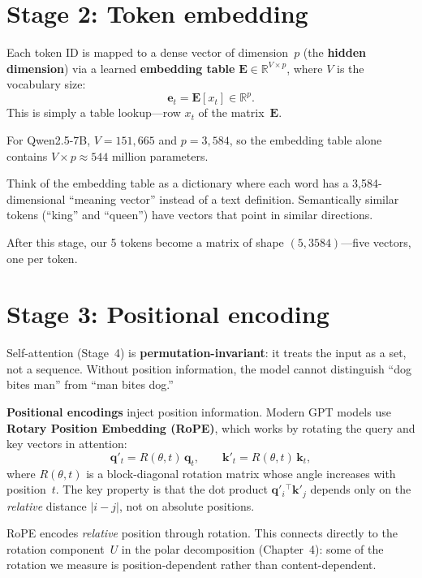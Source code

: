 \documentclass[11pt, twoside, openright]{memoir}
\begin{document}
\section{Stage 2: Token embedding}

Each token ID is mapped to a dense vector of dimension~$p$ (the
\textbf{hidden dimension}) via a learned \textbf{embedding table}
$\mathbf{E} \in \mathbb{R}^{V \times p}$, where $V$ is the vocabulary size:
\[
  \mathbf{e}_t = \mathbf{E}[x_t] \in \mathbb{R}^p.
\]
This is simply a table lookup---row $x_t$ of the matrix~$\mathbf{E}$.

For Qwen2.5-7B, $V = 151{,}665$ and $p = 3{,}584$, so the embedding table
alone contains $V \times p \approx 544$ million parameters.

\begin{analogy}
Think of the embedding table as a dictionary where each word has a
3{,}584-dimensional ``meaning vector'' instead of a text definition.
Semantically similar tokens (``king'' and ``queen'') have vectors that
point in similar directions.
\end{analogy}

After this stage, our 5 tokens become a matrix of shape $(5, 3584)$---five
vectors, one per token.

\section{Stage 3: Positional encoding}

Self-attention (Stage~4) is \textbf{permutation-invariant}: it treats the
input as a set, not a sequence.  Without position information, the model
cannot distinguish ``dog bites man'' from ``man bites dog.''

\textbf{Positional encodings} inject position information.  Modern GPT
models use \textbf{Rotary Position Embedding (RoPE)}, which works by
rotating the query and key vectors in attention:
\[
  \mathbf{q}'_t = R(\theta, t) \, \mathbf{q}_t,
  \qquad
  \mathbf{k}'_t = R(\theta, t) \, \mathbf{k}_t,
\]
where $R(\theta, t)$ is a block-diagonal rotation matrix whose angle
increases with position~$t$.  The key property is that the dot product
$\mathbf{q}'_i{}^\top \mathbf{k}'_j$ depends only on the \emph{relative}
distance $|i - j|$, not on absolute positions.

\begin{keyidea}
RoPE encodes \emph{relative} position through rotation.  This connects
directly to the rotation component~$U$ in the polar decomposition
(Chapter~4): some of the rotation we measure is position-dependent
rather than content-dependent.
\end{keyidea}
\end{document}
